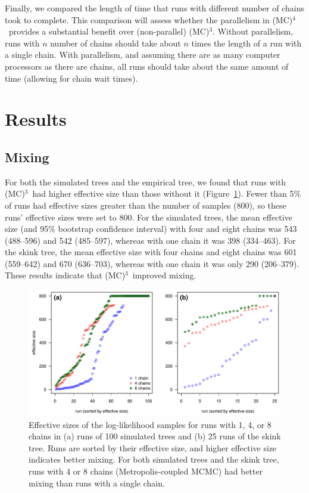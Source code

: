 \documentclass[12pt]{article}
\newcommand{\MCMCMC}{(MC)$^{3}$}
\newcommand{\MCMCMCMC}{(MC)$^{4}$}
\begin{document}
Finally, we compared the length of time that runs
with different number of chains took to complete.
%
This comparison will assess whether the parallelism in \MCMCMCMC\ 
provides a substantial benefit over (non-parallel) \MCMCMC.
%
Without parallelism, runs with $n$ number of chains
should take about $n$ times the length of a run with a single chain.
%
With parallelism, and assuming there are as many computer processors
as there are chains, all runs should take about the same amount of time
(allowing for chain wait times).


\section*{Results}

\subsection*{Mixing}

For both the simulated trees and the empirical tree,
we found that runs with \MCMCMC\ had higher effective size
than those without it (Figure~\ref{fig:eff-size}).
%
Fewer than 5\% of runs had effective sizes
greater than the number of samples (800),
so these runs' effective sizes were set to 800.
%
For the simulated trees,
the mean effective size (and 95\% bootstrap confidence interval)
with four and eight chains was 543 (488--596) and 542 (485--597),
whereas with one chain it was 398 (334--463).
%
For the skink tree, the mean effective size
with four chains and eight chains was 601 (559--642) and 670 (636--703),
whereas with one chain it was only 290 (206--379).
%
These results indicate that \MCMCMC\ improved mixing.

\begin{figure}
\begin{center}
\includegraphics[width=14cm]{eff-size.pdf}
\end{center}
\caption{Effective sizes of the log-likelihood samples
    for runs with 1, 4, or 8 chains in
    (a) runs of 100 simulated trees and (b) 25 runs of the skink tree.
    Runs are sorted by their effective size,
    and higher effective size indicates better mixing.
    For both simulated trees and the skink tree,
    runs with 4 or 8 chains (Metropolis-coupled MCMC)
    had better mixing than runs with a single chain.}
\label{fig:eff-size}
\end{figure}
\end{document}
